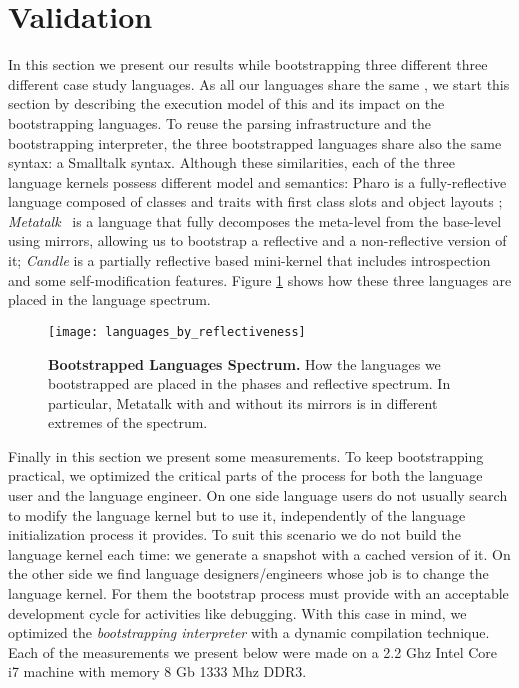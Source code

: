 \section{Validation} \label{sec:bootstrapping_validation}

In this section we present our results while bootstrapping three different three different case study languages.
As all our languages share the same \VM, we start this section by describing the execution model of this \VM and its impact on the bootstrapping languages.
To reuse the parsing infrastructure and the bootstrapping interpreter, the three bootstrapped languages share also the same syntax: a Smalltalk syntax. Although these similarities, each of the three language kernels possess different model and semantics: Pharo is a fully-reflective language composed of classes and traits with first class slots and object layouts \cite{Verw11a}; \emph{Metatalk}~\cite{Papo11a} is a language that fully decomposes the meta-level from the base-level using mirrors, allowing us to bootstrap a reflective and a non-reflective version of it; \emph{Candle} is a partially reflective  based mini-kernel that includes introspection and some self-modification features. Figure \ref{fig:languages_spectrum} shows how these three languages are placed in the language spectrum.%

\begin{figure}[ht]
\center
\texttt{[image: languages\_by\_reflectiveness]}
\caption{\textbf{Bootstrapped Languages Spectrum.} How the languages we bootstrapped are placed in the phases and reflective spectrum. In particular, Metatalk with and without its mirrors is in different extremes of the spectrum.\label{fig:languages_spectrum}}
\end{figure}

Finally in this section we present some measurements. To keep bootstrapping practical, we optimized the critical parts of the process for both the language user and the language engineer. On one side language users do not usually search to modify the language kernel but to use it, independently of the language initialization process it provides. To suit this scenario we do not build the language kernel each time: we generate a snapshot with a cached version of it. On the other side we find language designers/engineers whose job is to change the language kernel. For them the bootstrap process must provide with an acceptable development cycle for activities like debugging. With this case in mind, we optimized the \emph{bootstrapping interpreter} with a dynamic compilation technique. Each of the measurements we present below were made on a 2.2 Ghz Intel Core i7 machine with memory 8 Gb 1333 Mhz DDR3.


